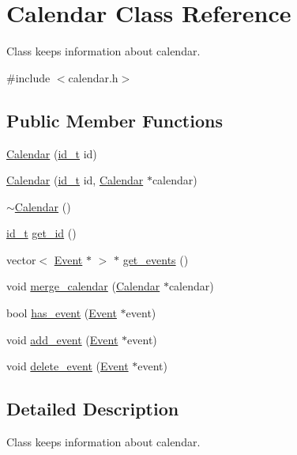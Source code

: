 \hypertarget{classCalendar}{
\section{Calendar Class Reference}
\label{dd/dac/classCalendar}
}


Class keeps information about calendar.  




{\ttfamily \#include $<$calendar.h$>$}

\subsection*{Public Member Functions}
\begin{DoxyCompactItemize}
\item 
\hyperlink{classCalendar_acf7171bfd7518524f62bee81554037d3}{Calendar} (\hyperlink{types_8h_ac948e8774f26ce7ea57a66b925e451b9}{id\_\-t} id)
\item 
\hyperlink{classCalendar_a8ccfb5918c6e3ff293e23936dea826fb}{Calendar} (\hyperlink{types_8h_ac948e8774f26ce7ea57a66b925e451b9}{id\_\-t} id, \hyperlink{classCalendar}{Calendar} $\ast$calendar)
\item 
\hyperlink{classCalendar_a23aa939f694874a8f98ec54326d80741}{$\sim$Calendar} ()
\item 
\hyperlink{types_8h_ac948e8774f26ce7ea57a66b925e451b9}{id\_\-t} \hyperlink{classCalendar_a853ad0f4635e09acbb4554267123ece4}{get\_\-id} ()
\item 
vector$<$ \hyperlink{classEvent}{Event} $\ast$ $>$ $\ast$ \hyperlink{classCalendar_aa1e9611c947c9b37975437b188066bf9}{get\_\-events} ()
\item 
void \hyperlink{classCalendar_a9ed5161b06c2a2acc8e5febbeeeb39b0}{merge\_\-calendar} (\hyperlink{classCalendar}{Calendar} $\ast$calendar)
\item 
bool \hyperlink{classCalendar_a46578e7e3f65bd5d523a108ad00965dd}{has\_\-event} (\hyperlink{classEvent}{Event} $\ast$event)
\item 
void \hyperlink{classCalendar_ad099edd0e82ca0a2ffb18702d029fffa}{add\_\-event} (\hyperlink{classEvent}{Event} $\ast$event)
\item 
void \hyperlink{classCalendar_a305abce38aacb905a0277f573f6b486c}{delete\_\-event} (\hyperlink{classEvent}{Event} $\ast$event)
\end{DoxyCompactItemize}


\subsection{Detailed Description}
Class keeps information about calendar. 

